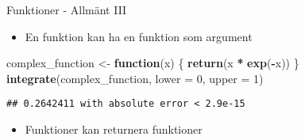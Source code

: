 \documentclass[
  11pt,
  ignorenonframetext,
]{beamer}
\newenvironment{Shaded}{\begin{snugshade}}{\end{snugshade}}
\newcommand{\AttributeTok}[1]{\textcolor[rgb]{0.13,0.29,0.53}{#1}}
\newcommand{\ControlFlowTok}[1]{\textcolor[rgb]{0.13,0.29,0.53}{\textbf{#1}}}
\newcommand{\DecValTok}[1]{\textcolor[rgb]{0.00,0.00,0.81}{#1}}
\newcommand{\FunctionTok}[1]{\textcolor[rgb]{0.13,0.29,0.53}{\textbf{#1}}}
\newcommand{\NormalTok}[1]{#1}
\newcommand{\OtherTok}[1]{\textcolor[rgb]{0.56,0.35,0.01}{#1}}
\newcommand{\SpecialCharTok}[1]{\textcolor[rgb]{0.81,0.36,0.00}{\textbf{#1}}}
\providecommand{\tightlist}{%
  \setlength{\itemsep}{0pt}\setlength{\parskip}{0pt}}
\begin{document}
\begin{frame}[fragile]{Funktioner - Allmänt III}
\label{funktioner---allmuxe4nt-iii}
\begin{itemize}
\tightlist
\item
  En funktion kan ha en funktion som argument
\end{itemize}

\begin{Shaded}
\begin{Highlighting}[]
\NormalTok{complex\_function }\OtherTok{\textless{}{-}} \ControlFlowTok{function}\NormalTok{(x) \{}
  \FunctionTok{return}\NormalTok{(x }\SpecialCharTok{*} \FunctionTok{exp}\NormalTok{(}\SpecialCharTok{{-}}\NormalTok{x))}
\NormalTok{\}}
\FunctionTok{integrate}\NormalTok{(complex\_function, }\AttributeTok{lower =} \DecValTok{0}\NormalTok{, }\AttributeTok{upper =} \DecValTok{1}\NormalTok{)}
\end{Highlighting}
\end{Shaded}

\begin{verbatim}
## 0.2642411 with absolute error < 2.9e-15
\end{verbatim}

\begin{itemize}
\tightlist
\item
  Funktioner kan returnera funktioner
\end{itemize}
\end{frame}
\end{document}
